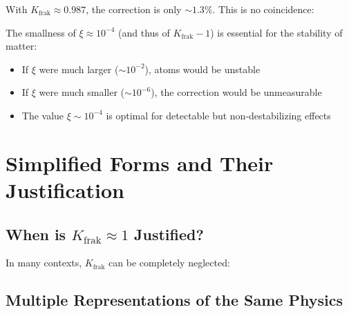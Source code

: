 	With $K_{\text{frak}} \approx 0.987$, the correction is only $\sim 1.3\%$. This is no coincidence:
	
	\begin{tcolorbox}[colback=blue!5!white,colframe=blue!75!black,title={Fine-Tuning of Nature}]
		The smallness of $\xi \approx 10^{-4}$ (and thus of $K_{\text{frak}} - 1$) is essential for the stability of matter:
		
		\begin{itemize}
			\item If $\xi$ were much larger ($\sim 10^{-2}$), atoms would be unstable
			\item If $\xi$ were much smaller ($\sim 10^{-6}$), the correction would be unmeasurable
			\item The value $\xi \sim 10^{-4}$ is optimal for detectable but non-destabilizing effects
		\end{itemize}
	\end{tcolorbox}
	
	\section{Simplified Forms and Their Justification}
	
	\subsection{When is $K_{\text{frak}} \approx 1$ Justified?}
	
	In many contexts, $K_{\text{frak}}$ can be completely neglected:
	
	\begin{table}[h]
		\centering
		\caption{Justification for neglecting $K_{\text{frak}}$}
	\end{table}
	
	\subsection{Multiple Representations of the Same Physics}
	
